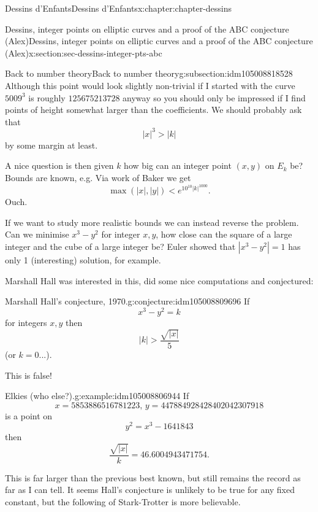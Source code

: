 \documentclass[oneside,10pt,]{book}
\numberwithin{equation}{section}
\newcommand{\lt}{<}
\newcommand{\gt}{>}
\begin{document}
\begin{chapterptx}{Dessins d'Enfants}{}{Dessins d'Enfants}{}{}{x:chapter:chapter-dessins}
\begin{sectionptx}{Dessins, integer points on elliptic curves and a proof of the ABC conjecture (Alex)}{}{Dessins, integer points on elliptic curves and a proof of the ABC conjecture (Alex)}{}{}{x:section:sec-dessins-integer-pts-abc}
\begin{subsectionptx}{Back to number theory}{}{Back to number theory}{}{}{g:subsection:idm105008818528}
Although this point would look slightly non-trivial if I started with the curve \(5009^3\) is roughly \(125675213728\) anyway so you should only be impressed if I find points of height somewhat larger than the coefficients. We should probably ask that%
\begin{equation*}
|x|^3 \gt |k|
\end{equation*}
by some margin at least.%
\par
A nice question is then given \(k\) how big can an integer point \((x,y)\) on \(E_k\) be? Bounds are known, e.g.  Via work of Baker we get%
\begin{equation*}
\max(|x|, |y|) \lt e^{10^{10}|k|^{1000}}\text{.}
\end{equation*}
Ouch.%
\par
If we want to study more realistic bounds we can instead reverse the problem. Can we minimise \(x^3 - y^2\) for integer \(x,y\), how close can the square of a large integer and the cube of a large integer be? Euler showed that \(|x^3 - y^2| = 1\) has only 1 (interesting) solution, for example.%
\par
Marshall Hall was interested in this, did some nice computations and conjectured:%
\begin{conjecture}{Marshall Hall's conjecture, 1970.}{}{g:conjecture:idm105008809696}%
If%
\begin{equation*}
x^3 - y^2 = k
\end{equation*}
for integers \(x,y\) then%
\begin{equation*}
|k| \gt \frac{\sqrt{|x|}}{5}
\end{equation*}
(or \(k =0\)...).%
\end{conjecture}
This is false!%
\begin{example}{Elkies (who else?).}{g:example:idm105008806944}%
If%
\begin{equation*}
x= 5853886516781223,\,y = 447884928428402042307918
\end{equation*}
is a point on%
\begin{equation*}
y^2 = x^3 - 1641843
\end{equation*}
then%
\begin{equation*}
\frac{\sqrt{|x|}}{k} = 46.6004943471754\text{.}
\end{equation*}
%
\end{example}
This is far larger than the previous best known, but still remains the record as far as I can tell. It seems Hall's conjecture is unlikely to be true for any fixed constant, but the following of Stark-Trotter is more believable.%

\end{subsectionptx}
\end{sectionptx}
\end{chapterptx}
\end{document}

